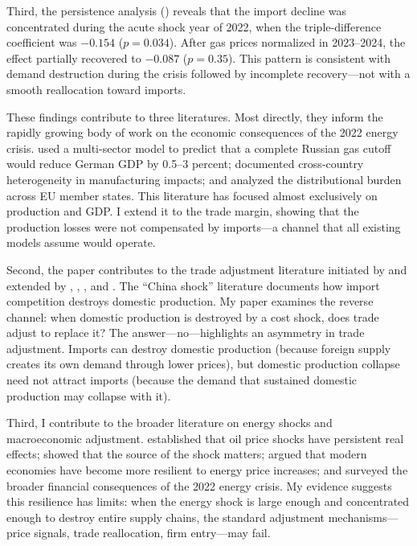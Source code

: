 \documentclass[12pt]{article}
\begin{document}
Third, the persistence analysis () reveals that the import decline was concentrated during the acute shock year of 2022, when the triple-difference coefficient was $-0.154$ ($p = 0.034$). After gas prices normalized in 2023--2024, the effect partially recovered to $-0.087$ ($p = 0.35$). This pattern is consistent with demand destruction during the crisis followed by incomplete recovery---not with a smooth reallocation toward imports.

These findings contribute to three literatures. Most directly, they inform the rapidly growing body of work on the economic consequences of the 2022 energy crisis. \citet{bachmann2022} used a multi-sector model to predict that a complete Russian gas cutoff would reduce German GDP by 0.5--3 percent; \citet{borin2023} documented cross-country heterogeneity in manufacturing impacts; and \citet{albrizio2023} analyzed the distributional burden across EU member states. This literature has focused almost exclusively on production and GDP. I extend it to the trade margin, showing that the production losses were not compensated by imports---a channel that all existing models assume would operate.

Second, the paper contributes to the trade adjustment literature initiated by \citet{autor2013china} and extended by \citet{autor2016china}, \citet{hummels2014}, \citet{dauth2014}, and \citet{feenstra1996}. The ``China shock'' literature documents how import competition destroys domestic production. My paper examines the reverse channel: when domestic production is destroyed by a cost shock, does trade adjust to replace it? The answer---no---highlights an asymmetry in trade adjustment. Imports can destroy domestic production (because foreign supply creates its own demand through lower prices), but domestic production collapse need not attract imports (because the demand that sustained domestic production may collapse with it).

Third, I contribute to the broader literature on energy shocks and macroeconomic adjustment. \citet{hamilton2003, hamilton2009oil} established that oil price shocks have persistent real effects; \citet{kilian2009} showed that the source of the shock matters; \citet{blanchard2010} argued that modern economies have become more resilient to energy price increases; and \citet{giglio2023} surveyed the broader financial consequences of the 2022 energy crisis. My evidence suggests this resilience has limits: when the energy shock is large enough and concentrated enough to destroy entire supply chains, the standard adjustment mechanisms---price signals, trade reallocation, firm entry---may fail.
\end{document}
